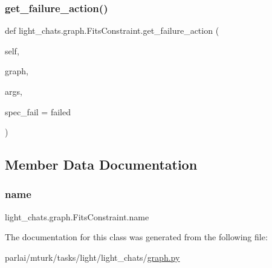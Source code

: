 \subsubsection{\texorpdfstring{get\+\_\+failure\+\_\+action()}{get\_failure\_action()}}
{\footnotesize\ttfamily def light\+\_\+chats.\+graph.\+Fits\+Constraint.\+get\+\_\+failure\+\_\+action (\begin{DoxyParamCaption}\item[{}]{self,  }\item[{}]{graph,  }\item[{}]{args,  }\item[{}]{spec\+\_\+fail = {\ttfamily \textquotesingle{}failed\textquotesingle{}} }\end{DoxyParamCaption})}



\subsection{Member Data Documentation}
\mbox{\label{classlight__chats_1_1graph_1_1FitsConstraint_a7de858979fc9366f1099b157151991b5}} 
\subsubsection{\texorpdfstring{name}{name}}
{\footnotesize\ttfamily light\+\_\+chats.\+graph.\+Fits\+Constraint.\+name\hspace{0.3cm}{\ttfamily [static]}}



The documentation for this class was generated from the following file\+:\begin{DoxyCompactItemize}
\item 
parlai/mturk/tasks/light/light\+\_\+chats/\hyperlink{parlai_2mturk_2tasks_2light_2light__chats_2graph_8py}{graph.\+py}\end{DoxyCompactItemize}
